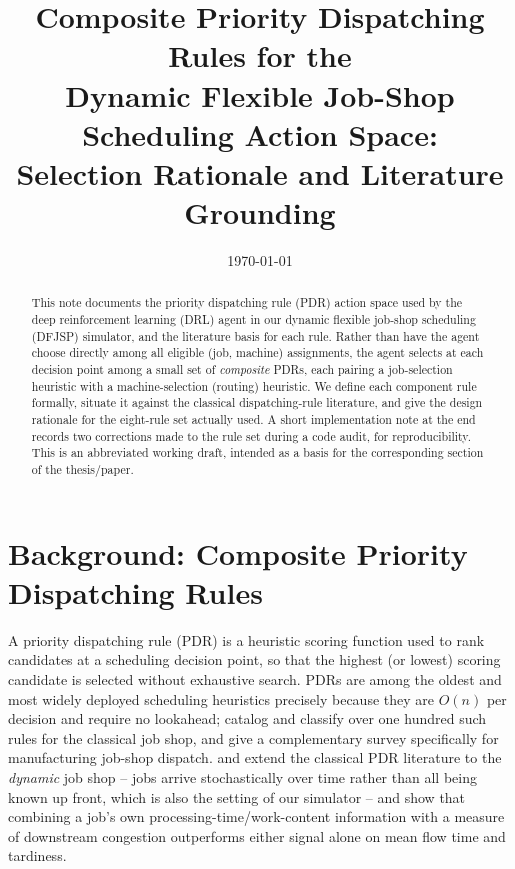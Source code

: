 \documentclass[conference]{IEEEtran}
\title{Composite Priority Dispatching Rules for the\\
Dynamic Flexible Job-Shop Scheduling Action Space:\\
Selection Rationale and Literature Grounding}
\author{}
\date{\today}
\begin{document}
\maketitle

\begin{abstract}
This note documents the priority dispatching rule (PDR) action space used by the
deep reinforcement learning (DRL) agent in our dynamic flexible job-shop scheduling
(DFJSP) simulator, and the literature basis for each rule. Rather than have the agent
choose directly among all eligible (job, machine) assignments, the agent selects at
each decision point among a small set of \emph{composite} PDRs, each pairing a
job-selection heuristic with a machine-selection (routing) heuristic. We define each
component rule formally, situate it against the classical dispatching-rule literature,
and give the design rationale for the eight-rule set actually used. A short
implementation note at the end records two corrections made to the rule set during a
code audit, for reproducibility. This is an abbreviated working draft, intended as a
basis for the corresponding section of the thesis/paper.
\end{abstract}

\section{Background: Composite Priority Dispatching Rules}
\label{sec:background}

A priority dispatching rule (PDR) is a heuristic scoring function used to rank
candidates at a scheduling decision point, so that the highest (or lowest) scoring
candidate is selected without exhaustive search. PDRs are among the oldest and most
widely deployed scheduling heuristics precisely because they are $O(n)$ per decision
and require no lookahead; \cite{panwalkar1977} catalog and classify over one hundred
such rules for the classical job shop, and \cite{blackstone1982} give a complementary
survey specifically for manufacturing job-shop dispatch. \cite{holthaus1997} and
\cite{rajendran1999} extend the classical PDR literature to the \emph{dynamic} job
shop -- jobs arrive stochastically over time rather than all being known up front,
which is also the setting of our simulator -- and show that combining a job's own
processing-time/work-content information with a measure of downstream congestion
outperforms either signal alone on mean flow time and tardiness.
\end{document}
